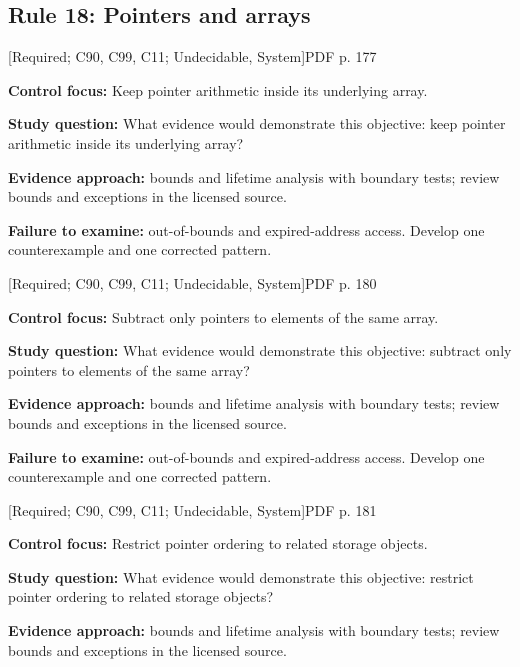 \documentclass[10pt,letterpaper]{article}
\begin{document}
\subsection{Rule 18: Pointers and arrays}
 \textsf{\footnotesize [Required; C90, C99, C11; Undecidable, System]}\hfill{\footnotesize PDF p. 177}\par
\textbf{Control focus:} Keep pointer arithmetic inside its underlying array.\par
\textbf{Study question:} What evidence would demonstrate this objective: keep pointer arithmetic inside its underlying array?\par
\textbf{Evidence approach:} bounds and lifetime analysis with boundary tests; review bounds and exceptions in the licensed source.\par
\textbf{Failure to examine:} out-of-bounds and expired-address access. Develop one counterexample and one corrected pattern.\par
\smallskip
{}
 \textsf{\footnotesize [Required; C90, C99, C11; Undecidable, System]}\hfill{\footnotesize PDF p. 180}\par
\textbf{Control focus:} Subtract only pointers to elements of the same array.\par
\textbf{Study question:} What evidence would demonstrate this objective: subtract only pointers to elements of the same array?\par
\textbf{Evidence approach:} bounds and lifetime analysis with boundary tests; review bounds and exceptions in the licensed source.\par
\textbf{Failure to examine:} out-of-bounds and expired-address access. Develop one counterexample and one corrected pattern.\par
\smallskip
{}
 \textsf{\footnotesize [Required; C90, C99, C11; Undecidable, System]}\hfill{\footnotesize PDF p. 181}\par
\textbf{Control focus:} Restrict pointer ordering to related storage objects.\par
\textbf{Study question:} What evidence would demonstrate this objective: restrict pointer ordering to related storage objects?\par
\textbf{Evidence approach:} bounds and lifetime analysis with boundary tests; review bounds and exceptions in the licensed source.\par
\end{document}
